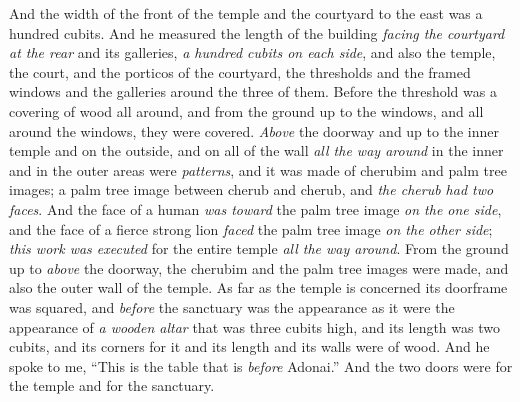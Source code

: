 \begin{biblechapter}
\verse And the width of the front of the temple and the courtyard to the east was a hundred cubits.
\verse And he measured the length of the building \textit{facing the courtyard} \textit{at the rear} and its galleries, \textit{a hundred cubits on each side}, and also the temple, the court, and the porticos of the courtyard,
\verse the thresholds and the framed windows and the galleries around the three of them. Before the threshold was a covering of wood all around, and from the ground up to the windows, and all around the windows, they were covered.
\verse \textit{Above} the doorway and up to the inner temple and on the outside, and on all of the wall \textit{all the way around} in the inner and in the outer areas were \textit{patterns},
\verse and it was made of cherubim and palm tree images; a palm tree image between cherub and cherub, and \textit{the cherub had two faces}.
\verse And the face of a human \textit{was toward} the palm tree image \textit{on the one side}, and the face of a fierce strong lion \textit{faced} the palm tree image \textit{on the other side}; \textit{this work was executed} for the entire temple \textit{all the way around}.
\verse From the ground up to \textit{above} the doorway, the cherubim and the palm tree images were made, and also the outer wall of the temple.
\verse As far as the temple is concerned its doorframe was squared, and \textit{before} the sanctuary was the appearance as it were the appearance of
\verse \textit{a wooden altar} that was three cubits high, and its length was two cubits, and its corners for it and its length and its walls were of wood. And he spoke to me, “This is the table that is \textit{before} Adonai.”
\verse And the two doors were for the temple and for the sanctuary.

\end{biblechapter}
